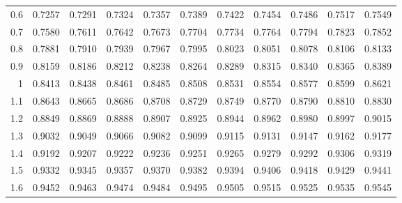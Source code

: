 \begin{center}
\begin{minipage}{5in}
\begin{center}
\begin{tabular}{|r|rrrrrrrrrr|}
	\cellcolor{lightgray}0.6	&\cellcolor{lightgray}	0.7257	&\cellcolor{lightgray}	0.7291	&\cellcolor{lightgray}	0.7324	&\cellcolor{lightgray}	0.7357	&\cellcolor{lightgray}	0.7389	&\cellcolor{lightgray}	0.7422	&\cellcolor{lightgray}	0.7454	&\cellcolor{lightgray}	0.7486	&\cellcolor{lightgray}	0.7517	&\cellcolor{lightgray}	0.7549	\\
	\cellcolor{lightgray}0.7	&\cellcolor{lightgray}	0.7580	&\cellcolor{lightgray}	0.7611	&\cellcolor{lightgray}	0.7642	&\cellcolor{lightgray}	0.7673	&\cellcolor{lightgray}	0.7704	&\cellcolor{lightgray}	0.7734	&\cellcolor{lightgray}	0.7764	&\cellcolor{lightgray}	0.7794	&\cellcolor{lightgray}	0.7823	&\cellcolor{lightgray}	0.7852	\\
	\cellcolor{lightgray}0.8	&\cellcolor{lightgray}	0.7881	&\cellcolor{lightgray}	0.7910	&\cellcolor{lightgray}	0.7939	&\cellcolor{lightgray}	0.7967	&\cellcolor{lightgray}	0.7995	&\cellcolor{lightgray}	0.8023	&\cellcolor{lightgray}	0.8051	&\cellcolor{lightgray}	0.8078	&\cellcolor{lightgray}	0.8106	&\cellcolor{lightgray}	0.8133	\\
	\cellcolor{lightgray}0.9	&\cellcolor{lightgray}	0.8159	&\cellcolor{lightgray}	0.8186	&\cellcolor{lightgray}	0.8212	&\cellcolor{lightgray}	0.8238	&\cellcolor{lightgray}	0.8264	&\cellcolor{lightgray}	0.8289	&\cellcolor{lightgray}	0.8315	&\cellcolor{lightgray}	0.8340	&\cellcolor{lightgray}	0.8365	&\cellcolor{lightgray}	0.8389	\\
	1	&	0.8413	&	0.8438	&	0.8461	&	0.8485	&	0.8508	&	0.8531	&	0.8554	&	0.8577	&	0.8599	&	0.8621	\\
	1.1	&	0.8643	&	0.8665	&	0.8686	&	0.8708	&	0.8729	&	0.8749	&	0.8770	&	0.8790	&	0.8810	&	0.8830	\\
	1.2	&	0.8849	&	0.8869	&	0.8888	&	0.8907	&	0.8925	&	0.8944	&	0.8962	&	0.8980	&	0.8997	&	0.9015	\\
	1.3	&	0.9032	&	0.9049	&	0.9066	&	0.9082	&	0.9099	&	0.9115	&	0.9131	&	0.9147	&	0.9162	&	0.9177	\\
	1.4	&	0.9192	&	0.9207	&	0.9222	&	0.9236	&	0.9251	&	0.9265	&	0.9279	&	0.9292	&	0.9306	&	0.9319	\\
	\cellcolor{lightgray}1.5	&\cellcolor{lightgray}	0.9332	&\cellcolor{lightgray}	0.9345	&\cellcolor{lightgray}	0.9357	&\cellcolor{lightgray}	0.9370	&\cellcolor{lightgray}	0.9382	&\cellcolor{lightgray}	0.9394	&\cellcolor{lightgray}	0.9406	&\cellcolor{lightgray}	0.9418	&\cellcolor{lightgray}	0.9429	&\cellcolor{lightgray}	0.9441	\\
	\cellcolor{lightgray}1.6	&\cellcolor{lightgray}	0.9452	&\cellcolor{lightgray}	0.9463	&\cellcolor{lightgray}	0.9474	&\cellcolor{lightgray}	0.9484	&\cellcolor{lightgray}	0.9495	&\cellcolor{lightgray}	0.9505	&\cellcolor{lightgray}	0.9515	&\cellcolor{lightgray}	0.9525	&\cellcolor{lightgray}	0.9535	&\cellcolor{lightgray}	0.9545	\\

\end{tabular}
\end{center}
\end{minipage}
\end{center}
